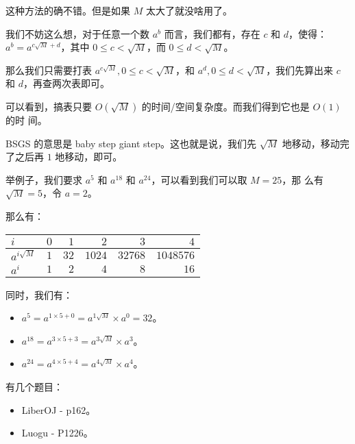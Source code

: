 \begin{frame}
这种方法的确不错。但是如果 $M$ 太大了就没啥用了。

我们不妨这么想，对于任意一个数 $a^b$ 而言，我们都有，存在 $c$ 和 $d$，使得：$a^b
= a^{c \sqrt M + d}$，其中 $0 \le c < \sqrt M$，而 $0 \le d < \sqrt M$。\pause

那么我们只需要打表 $a^{c \sqrt M}, 0 \le c < \sqrt M$，和 $a^{d}, 0 \le d <
\sqrt M$，我们先算出来 $c$ 和 $d$，再查两次表即可。\pause

可以看到，搞表只要 $O(\sqrt M)$ 的时间/空间复杂度。而我们得到它也是 $O(1)$ 的时
间。
\end{frame}

\begin{frame}
BSGS 的意思是 baby step giant step。这也就是说，我们先 $\sqrt M$ 地移动，移动完
了之后再 $1$ 地移动，即可。
\end{frame}

\begin{frame}
举例子，我们要求 $a^5$ 和 $a^{18}$ 和 $a^{24}$，可以看到我们可以取 $M = 25$，那
么有 $\sqrt M = 5$，令 $a = 2$。\pause

那么有：
\begin{center}
\begin{tabular}{lrrrrr}
    \toprule
    $i$               & $0$ & $1$  & $2$    & $3$     & $4$       \\
    \midrule
    $a^{i \sqrt M}$   & $1$ & $32$ & $1024$ & $32768$ & $1048576$ \\
    $a^{i}$           & $1$ & $2$  & $4$    & $8$     & $16$      \\
    \bottomrule
\end{tabular}
\end{center} \pause

同时，我们有：\pause
\begin{itemize}
    \item $a^5 = a^{1 \times 5 + 0} = a^{1 \sqrt M} \times a^{0} = 32$。\pause
    \item $a^{18} = a^{3 \times 5 + 3} = a^{3 \sqrt M} \times a^{3}$。\pause
    \item $a^{24} = a^{4 \times 5 + 4} = a^{4 \sqrt M} \times a^{4}$。
\end{itemize}
\end{frame}

\begin{frame}
有几个题目：
\begin{itemize}
    \item LiberOJ - p162。
    \item Luogu - P1226。
\end{itemize}
\end{frame}
